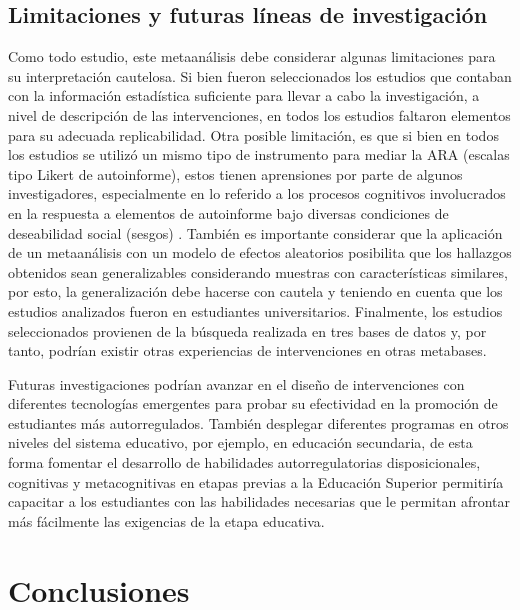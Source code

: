 \documentclass[spanish]{textolivre}
\begin{document}
\subsection{Limitaciones y futuras líneas de investigación}

Como todo estudio, este metaanálisis debe considerar algunas limitaciones para su interpretación cautelosa. Si bien fueron seleccionados los estudios que contaban con la información estadística suficiente para llevar a cabo la investigación, a nivel de descripción de las intervenciones, en todos los estudios faltaron elementos para su adecuada replicabilidad. Otra posible limitación, es que si bien en todos los estudios se utilizó un mismo tipo de instrumento para mediar la ARA (escalas tipo Likert de autoinforme), estos tienen aprensiones por parte de algunos investigadores, especialmente en lo referido a los procesos cognitivos involucrados en la respuesta a elementos de autoinforme bajo diversas condiciones de deseabilidad social (sesgos) \cite{holtgraves2004social}. También es importante considerar que la aplicación de un metaanálisis con un modelo de efectos aleatorios posibilita que los hallazgos obtenidos sean generalizables considerando muestras con características similares, por esto, la generalización debe hacerse con cautela y teniendo en cuenta que los estudios analizados fueron en estudiantes universitarios. Finalmente, los estudios seleccionados provienen de la búsqueda realizada en tres bases de datos y, por tanto, podrían existir otras experiencias de intervenciones en otras metabases. 

Futuras investigaciones podrían avanzar en el diseño de intervenciones con diferentes tecnologías emergentes para probar su efectividad en la promoción de estudiantes más autorregulados. También desplegar diferentes programas en otros niveles del sistema educativo, por ejemplo, en educación secundaria, de esta forma fomentar el desarrollo de habilidades autorregulatorias disposicionales, cognitivas y metacognitivas en etapas previas a la Educación Superior permitiría capacitar a los estudiantes con las habilidades necesarias que le permitan afrontar más fácilmente las exigencias de la etapa educativa. 


\section{Conclusiones}
\end{document}
